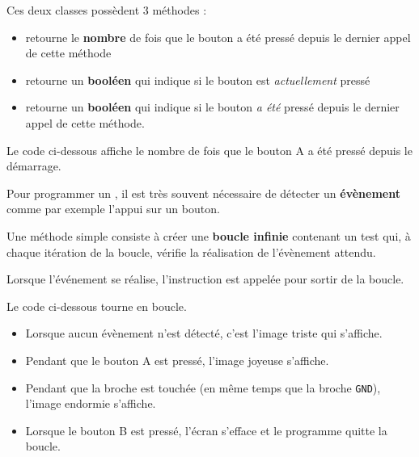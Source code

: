 Ces deux classes possèdent 3 méthodes :
\begin{itemize}
    \item {} retourne le \textbf{nombre} de fois que le bouton a été pressé depuis le dernier appel de cette méthode
    \item {} retourne un \textbf{booléen} qui indique si le bouton est \emph{actuellement} pressé
    \item {} retourne un \textbf{booléen} qui indique si le bouton \emph{a été} pressé depuis le dernier appel de cette méthode.
\end{itemize}

\begin{methode}
Le code ci-dessous affiche le nombre de fois que le bouton A a été pressé depuis le démarrage.
\end{methode}

Pour programmer un \mb, il est très souvent nécessaire de détecter un \textbf{évènement} comme par exemple l'appui sur un bouton.\par
Une méthode simple consiste à créer une \textbf{boucle infinie}  contenant un test qui, à chaque itération de la boucle, vérifie la réalisation de l'évènement attendu.\par
Lorsque l'événement se réalise, l'instruction  est appelée pour sortir de la boucle.

\begin{methode}
Le code ci-dessous tourne en boucle.
\begin{itemize}
    \item Lorsque aucun évènement n'est détecté, c'est l'image triste  qui s'affiche.
    \item Pendant que le bouton A est pressé, l'image joyeuse  s'affiche.
    \item Pendant que la broche  est touchée (en même temps que la broche \texttt{GND}), l'image endormie  s'affiche.
    \item Lorsque le bouton B est pressé, l'écran s'efface et le programme quitte la boucle.
\end{itemize}

\end{methode}

